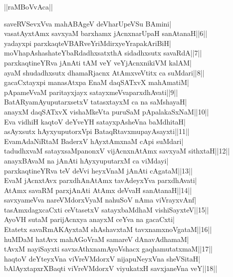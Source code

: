 \documentclass{article}
\begin{document}
\begin{center}
||raMBoVvAca||
\end{center}

saveRVSevxVva mahABAgeV deVharUpeVSu BAmini|\\
vasatAyxtAmx savxyaM barxhamx jAcnxnarUpaH sanAtanaH||6||\\
yadayxpi parxkaqteVBARveYriMdirxyeYrapakAriBiH|\\
moVhapAshashateYbaRdadhxsatxthA sidadhxsutx savaRdA||7||\\
parxkaqtineYRva jAnAti tAM veY veYjAcnxnikiVM kalAM|\\
ayaM shudadhxsutx dhamaRjacnx AtAmxveVtitx ca suMdari||8||\\
gacaCxtayxpi manasAtxpa EnaM daqSATxvX mahAmatiM|\\
pApameVvaM paritayxjayx satayxmeVvaparxdhAvati||9||\\
BatARyamAyuputarxsetxV tatasxtayxM ca na saMshayaH|\\
anayxM daqSATxvX vishaMkeVta puruSaM pApalakaSxNaM||10||\\
Eva vidhiH kaqtoV deYveYH satayxpAsheVna baMdhitaH|\\
asAyxsutx hAyxyuputorxVpi BataqRtavxmupayAsayxti||11||\\
EvamAdaNiRtaM BaderxV hAyxtAmxnaM cApi suMdari|\\
tadudhxvaM satayxsaMpanonxV vijAcnxnAtAmx savxyaM sithxtaH||12||\\
anayxBAvaM na jAnAti hAyxyuputarxM ca viMdayi|\\
parxkaqtineYRva teV deVvi heyxVnaM jAnAti cAgataM||13||\\
EvaM jAcnxtAvx parxdhAnAtAmx tavAdeyxYva parxdhAvati|\\
AtAmx savaRM parxjAnAti AtAmx deVvaH sanAtanaH||14||\\
savxyameVva nareVMdorxVyaM nahuSoV nAma viVrayxvAnf|\\
tasAmxdagxcaCxti ceVtasetxV satayxbaMdhaM vishiSayxteV||15||\\
AyoVH sutaM parijAcnxya anayxM ceYva na gacaCxti|\\
Etatetx savaRmAKAyxtaM shAshavxtaM tavxnamxnoVgataM||16||\\
huMDaM hatAvx mahAGoVraM samareV dAnavAdhamaM|\\
tAvxM nayiSayxti savxsAthxnamAyoVshacx gaqhamutatxmaM||17||\\
haqtoV deYteyxVna viVreVMdorxV nijapuNeyxVna sheVSitaH|\\
bAlAyxtapxrXBaqti viVreVMdorxV viyukatxH savxjaneVna veY||18||\\
\end{document}
